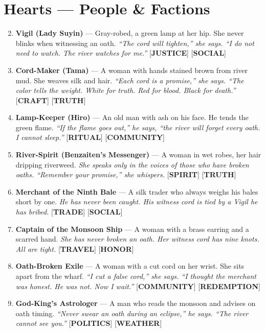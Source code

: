 \section*{Hearts --- People \& Factions}
\label{sec:lethai-ar-people-revised}
\begin{enumerate}
\setcounter{enumi}{1}
\item \textbf{Vigil (Lady Suyin)} --- Gray-robed, a green lamp at her hip. She never blinks when witnessing an oath.
  \hfill \textit{``The cord will tighten,'' she says. ``I do not need to watch. The river watches for me.''} [\textbf{JUSTICE}] [\textbf{SOCIAL}]
\item \textbf{Cord-Maker (Tama)} --- A woman with hands stained brown from river mud. She weaves silk and hair.
  \hfill \textit{``Each cord is a promise,'' she says. ``The color tells the weight. White for truth. Red for blood. Black for death.''} [\textbf{CRAFT}] [\textbf{TRUTH}]
\item \textbf{Lamp-Keeper (Hiro)} --- An old man with ash on his face. He tends the green flame.
  \hfill \textit{``If the flame goes out,'' he says, ``the river will forget every oath. I cannot sleep.''} [\textbf{RITUAL}] [\textbf{COMMUNITY}]
\item \textbf{River-Spirit (Benzaiten's Messenger)} --- A woman in wet robes, her hair dripping riverweed.
  \hfill \textit{She speaks only in the voices of those who have broken oaths. ``Remember your promise,'' she whispers.} [\textbf{SPIRIT}] [\textbf{TRUTH}]
\item \textbf{Merchant of the Ninth Bale} --- A silk trader who always weighs his bales short by one.
  \hfill \textit{He has never been caught. His witness cord is tied by a Vigil he has bribed.} [\textbf{TRADE}] [\textbf{SOCIAL}]
\item \textbf{Captain of the Monsoon Ship} --- A woman with a brass earring and a scarred hand.
  \hfill \textit{She has never broken an oath. Her witness cord has nine knots. All are tight.} [\textbf{TRAVEL}] [\textbf{HONOR}]
\item \textbf{Oath-Broken Exile} --- A woman with a cut cord on her wrist. She sits apart from the wharf.
  \hfill \textit{``I cut a false cord,'' she says. ``I thought the merchant was honest. He was not. Now I wait.''} [\textbf{COMMUNITY}] [\textbf{REDEMPTION}]
\item \textbf{God-King's Astrologer} --- A man who reads the monsoon and advises on oath timing.
  \hfill \textit{``Never swear an oath during an eclipse,'' he says. ``The river cannot see you.''} [\textbf{POLITICS}] [\textbf{WEATHER}]

\end{enumerate}
